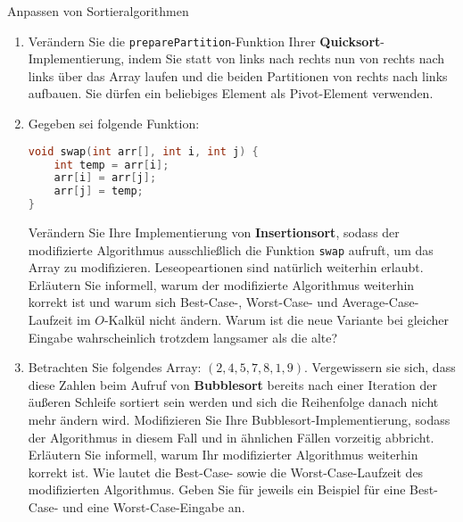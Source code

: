 \documentclass[11pt,a4paper]{article}
\begin{document}
\begin{aufgabe}{2}{Anpassen von Sortieralgorithmen}
    \begin{enumerate}
        \item Verändern Sie die \texttt{preparePartition}-Funktion Ihrer \textbf{Quicksort}-Implementierung, indem Sie statt von links nach rechts nun von rechts nach links über das Array laufen und die beiden Partitionen von rechts nach links aufbauen.
        Sie dürfen ein beliebiges Element als Pivot-Element verwenden.

        \item Gegeben sei folgende Funktion:
        \begin{lstlisting}[language=c++]
void swap(int arr[], int i, int j) {
    int temp = arr[i];
    arr[i] = arr[j];
    arr[j] = temp;
} 
        \end{lstlisting}
        Verändern Sie Ihre Implementierung von \textbf{Insertionsort}, sodass der modifizierte Algorithmus ausschließlich die Funktion \texttt{swap} aufruft, um das Array zu modifizieren. Leseopeartionen sind natürlich weiterhin erlaubt.
        Erläutern Sie informell, warum der modifizierte Algorithmus weiterhin korrekt ist und warum sich Best-Case-, Worst-Case- und Average-Case-Laufzeit im $O$-Kalkül nicht ändern.
        Warum ist die neue Variante bei gleicher Eingabe wahrscheinlich trotzdem langsamer als die alte?

        \item Betrachten Sie folgendes Array: $(2, 4, 5, 7, 8, 1, 9)$. Vergewissern sie sich, dass diese Zahlen beim Aufruf von \textbf{Bubble\-sort} bereits nach einer Iteration der äußeren Schleife sortiert sein werden und sich die Reihenfolge danach nicht mehr ändern wird.
        Modifizieren Sie Ihre Bubblesort-Implementierung, sodass der Algorithmus in diesem Fall und in ähnlichen Fällen vorzeitig abbricht.
        Erläutern Sie informell, warum Ihr modifizierter Algorithmus weiterhin korrekt ist.
        Wie lautet die Best-Case- sowie die Worst-Case-Laufzeit des modifizierten Algorithmus.
        Geben Sie für jeweils ein Beispiel für eine Best-Case- und eine Worst-Case-Eingabe an.
    \end{enumerate}
\end{aufgabe}
\end{document}
